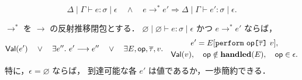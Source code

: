 \begin{lemma}[多歩の型保存]
\label{lem:fxi-multistep-preservation}
\[
  \Delta\mid\Gamma\vdash e:\sigma\mid\epsilon
  \quad\land\quad
  e\longrightarrow^{*}e'
  \Longrightarrow
  \Delta\mid\Gamma\vdash e':\sigma\mid\epsilon.
\]
\end{lemma}

\begin{theorem}
\label{thm:fxi-effect-safety}
$\longrightarrow^{*}$ を $\longrightarrow$ の反射推移閉包とする．
$\varnothing\mid\varnothing\vdash e:\sigma\mid\epsilon$
かつ $e\longrightarrow^{*}e'$ ならば，
\[
  \mathsf{Val}(e')
  \quad\lor\quad
  \exists e''.\ e'\longrightarrow e''
  \quad\lor\quad
  \exists E,\mathsf{op},\overline{\tau},v.\quad
    \begin{gathered}
      e'=E[\texttt{perform}~\mathsf{op}
           \texttt{[} \overline{\tau} \texttt{]}~v],\\
      \mathsf{Val}(v),\quad
      \mathsf{op}\notin\mathbf{handled}(E),\quad
      \mathsf{op}\in\epsilon.
    \end{gathered}
\]
特に，$\epsilon=\varnothing$ ならば，
到達可能な各 $e'$ は値であるか，一歩簡約できる．
\end{theorem}
